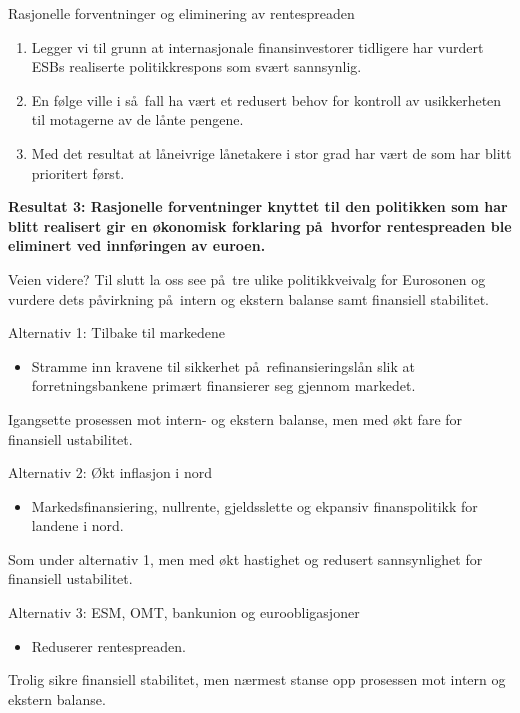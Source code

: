 \documentclass[notes=show notes]{beamer}
\begin{document}
\begin{frame}{Rasjonelle forventninger og eliminering av rentespreaden}
	\begin{enumerate}
		\item Legger vi til grunn at internasjonale finansinvestorer tidligere har vurdert  
		ESBs realiserte politikkrespons som sv\ae rt sannsynlig.
		\item En f\o lge ville i s\aa \ fall ha v\ae rt et redusert behov for kontroll av usikkerheten til motagerne av de l\aa nte pengene. 
		\item Med det resultat at l\aa neivrige l\aa netakere i stor grad har v\ae rt de som har blitt prioritert f\o rst.
	\end{enumerate}
\end{frame}
\begin{frame}
\textbf{Resultat 3: Rasjonelle forventninger knyttet til den politikken som har blitt realisert gir en  \o konomisk forklaring p\aa \ hvorfor rentespreaden ble eliminert ved innf\o ringen av euroen.}
\end{frame}
\begin{frame}{Veien videre?}
Til slutt la oss see p\aa \ tre ulike politikkveivalg for Eurosonen og vurdere dets p\aa virkning p\aa  \ intern og ekstern balanse samt finansiell stabilitet.
\end{frame}
\begin{frame}{Alternativ 1: Tilbake til markedene}
\begin{itemize}
	\item Stramme inn kravene til sikkerhet p\aa \ refinansieringsl\aa n  slik at forretningsbankene
	prim\ae rt finansierer seg gjennom markedet.
\end{itemize}
Igangsette prosessen mot intern- og ekstern balanse, men med \o kt fare for finansiell ustabilitet.
\end{frame}
\begin{frame}{Alternativ 2: \O kt inflasjon i nord}
\begin{itemize}
	\item Markedsfinansiering, nullrente, gjeldsslette og ekpansiv finanspolitikk for landene i nord.
\end{itemize}
Som under alternativ 1, men med \o kt hastighet og redusert sannsynlighet for finansiell ustabilitet.
\end{frame}
\begin{frame}{Alternativ 3: ESM, OMT, bankunion og euroobligasjoner}
\begin{itemize}
	\item Reduserer rentespreaden. 
\end{itemize}
Trolig sikre finansiell stabilitet, men n\ae rmest stanse opp prosessen mot intern og ekstern balanse.
\end{frame}
\end{document}
